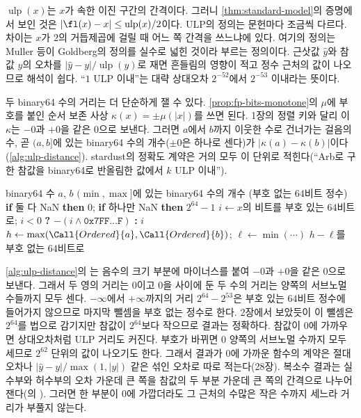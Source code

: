 $\operatorname{ulp}(x)$는 $x$가 속한 이진 구간의 간격이다. 그러니 \cref{thm:standard-model}의 증명에서 보인 것은 $|\fl(x)-x|\le\operatorname{ulp}(x)/2$이다. ULP의 정의는 문헌마다 조금씩 다르다. 차이는 $x$가 $2$의 거듭제곱에 걸릴 때 어느 쪽 간격을 쓰느냐에 있다. 여기의 정의는 Muller 등이 Goldberg의 정의를 실수로 넓힌 것이라 부르는 정의이다\cite{goldberg1991,muller2018handbook}. 근삿값 $\hat y$와 참값 $y$의 오차를 $|\hat y-y|/\operatorname{ulp}(y)$로 재면 흔들림의 영향이 적고 정수 근처의 값이 나오므로 해석이 쉽다. ``$1$ ULP 이내''는 대략 상대오차 $2^{-52}$에서 $2^{-53}$ 이내라는 뜻이다.

두 binary64 수의 거리는 더 단순하게 잴 수 있다. \cref{prop:fp-bits-monotone}의 $\mu$에 부호를 붙인 순서 보존 사상 $\kappa(x)=\pm\mu(|x|)$를 쓰면 된다. 1장의 정렬 키와 달리 이 $\kappa$는 $-0$과 $+0$을 같은 $0$으로 보낸다. 그러면 $a$에서 $b$까지 이웃한 수로 건너가는 걸음의 수, 곧 $(a,b]$에 있는 binary64 수의 개수($\pm0$은 하나로 센다)가 $|\kappa(a)-\kappa(b)|$이다(\cref{alg:ulp-distance}). stardust의 정확도 계약은 거의 모두 이 단위로 적힌다(``Arb로 구한 참값을 binary64로 반올림한 값에서 $k$ ULP 이내'').

\begin{algorithm}[htbp]
\begin{algorithmic}[1]
\Require binary64 수 $a$, $b$
\Ensure $(\min,\max]$에 있는 binary64 수의 개수 (부호 없는 $64$비트 정수)
\State \textbf{if} 둘 다 NaN \textbf{then} \Return $0$; \textbf{if} 하나만 NaN \textbf{then} \Return $2^{64}-1$ 
 
  \State $i\gets x$의 비트를 부호 있는 $64$비트로; \Return $i<0$ \textbf{?} $-(i\wedge\mathtt{0x7FF\ldots F})$ \textbf{:} $i$
\EndFunction
\State $h\gets\max(\Call{Ordered}{a},\Call{Ordered}{b})$; $\ell\gets\min(\cdots)$
\State \Return $h-\ell$를 부호 없는 $64$비트로 
\end{algorithmic}
\caption{두 binary64 수 사이의 ULP 거리 (stardust 의 )}
\label{alg:ulp-distance}
\end{algorithm}

\cref{alg:ulp-distance}의 는 음수의 크기 부분에 마이너스를 붙여 $-0$과 $+0$을 같은 $0$으로 보낸다. 그래서 두 영의 거리는 $0$이고 $0$을 사이에 둔 두 수의 거리는 양쪽의 서브노멀 수들까지 모두 센다. $-\infty$에서 $+\infty$까지의 거리 $2^{64}-2^{53}$은 부호 있는 $64$비트 정수에 들어가지 않으므로 마지막 뺄셈을 부호 없는 정수로 한다. 2장에서 보았듯이 이 뺄셈은 $2^{64}$를 법으로 감기지만 참값이 $2^{64}$보다 작으므로 결과는 정확하다. 참값이 $0$에 가까우면 상대오차처럼 ULP 거리도 커진다. 부호가 바뀌면 $0$ 양쪽의 서브노멀 수까지 모두 세므로 $2^{62}$ 단위의 값이 나오기도 한다. 그래서 결과가 $0$에 가까운 함수의 계약은 절대오차나 $|\hat y-y|/\max(1,|y|)$ 같은 섞인 오차로 따로 적는다(28장). 복소수 결과는 실수부와 허수부의 오차 가운데 큰 쪽을 참값의 두 부분 가운데 큰 쪽의 간격으로 나누어 잰다(의 ). 그러면 한 부분이 $0$에 가깝더라도 그 근처의 수많은 작은 수까지 세느라 거리가 부풀지 않는다.

